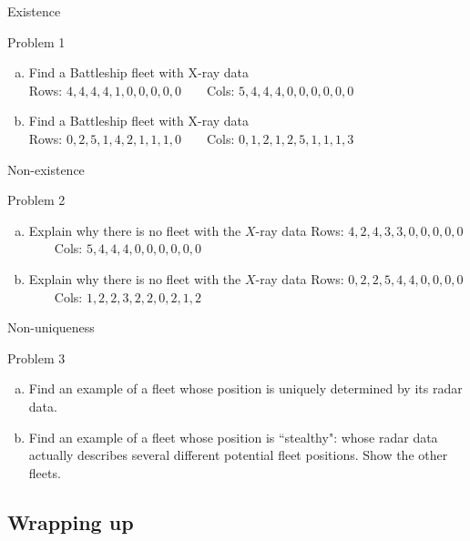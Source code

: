 \documentclass{beamer}
\begin{document}
\begin{frame}{Existence}
  \begin{block}{Problem 1}
    \begin{enumerate}[(a)]
      \item Find a Battleship fleet with X-ray data\\
      Rows: $4,4,4,4,1,0,0,0,0,0$\ \ \ \ 
      Cols: $5,4,4,4,0,0,0,0,0,0$
      \item Find a Battleship fleet with X-ray data\\
      Rows: $0,2,5,1,4,2,1,1,1,0$\ \ \ \ 
      Cols: $0,1,2,1,2,5,1,1,1,3$
    \end{enumerate}
  \end{block}
\end{frame}
    
\begin{frame}{Non-existence}
  \begin{block}{Problem 2}
    \begin{enumerate}[(a)]
      \item Explain why there is no fleet with the $X$-ray data
      Rows: $4,2,4,3,3,0,0,0,0,0$\ \ \ \ 
      Cols: $5,4,4,4,0,0,0,0,0,0$
      \item Explain why there is no fleet with the $X$-ray data
      Rows: $0,2,2,5,4,4,0,0,0,0$\ \ \ \ 
      Cols: $1,2,2,3,2,2,0,2,1,2$
    \end{enumerate}
  \end{block}
\end{frame}

\begin{frame}{Non-uniqueness}
  \begin{block}{Problem 3}
    \begin{enumerate}[(a)]
	  \item Find an example of a fleet whose position is uniquely determined by
            its radar data.
	  \item Find an example of a fleet whose position is ``stealthy": whose
			radar data actually describes several different potential fleet
            positions.  Show the other fleets.
    \end{enumerate}
  \end{block}
\end{frame}
    

\subsection{Wrapping up}
\end{document}
